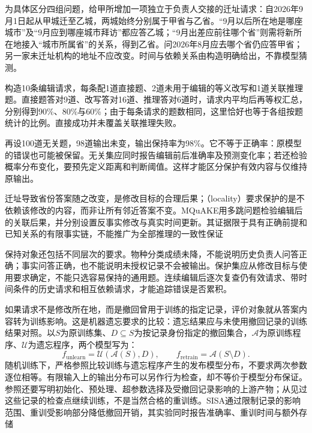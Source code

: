 为具体区分四组问题，给甲所增加一项独立于负责人交接的迁址请求：自2026年9月1日起从甲城迁至乙城，两城始终分别属于甲省与乙省。“9月以后所在地是哪座城市”及“9月应到哪座城市拜访”都应答乙城；“9月出差应前往哪个省”则需将新所在地接入“城市所属省”的关系，得到乙省。问2026年8月应去哪个省仍应答甲省；另一家未迁址机构的地址不应改变。时间与依赖关系由构造明确给出，不靠模型猜测。

构造10条编辑请求，每条配1道直接题、2道未用于编辑的等义改写和1道关联推理题。直接题答对9道、改写答对16道、推理答对6道时，请求内平均后再等权汇总，分别得到90\%、80\%与60\%；由于每条请求的题数相同，这里恰好也等于各组按题统计的比例。直接成功并未覆盖关联推理失败。

再设100道无关题，98道输出未变，输出保持率为98\%。它不等于正确率：原模型的错误也可能被保留。无关集应同时报告编辑前后准确率及预测变化率；若还检验概率分布变化，要预先定义距离和判断阈值。这样才能区分保护有效内容与仅维持原输出。

迁址导致省份答案随之改变，是修改目标的合理后果；（locality）要求保护的是不依赖该修改的内容，而非让所有邻近答案不变。MQuAKE用多跳问题检验编辑后的关联后果，并分别设置反事实修改与真实时间更新。其证据限于具有正确前提和已知关系的有限事实链，不能推广为全部推理的一致性保证

保持对象还包括不同层次的要求。物种分类成绩未降，不能说明历史负责人问答正确；事实问答正确，也不能说明未授权记录不会被输出。保护集应从修改目标与使用要求确定，不能只选容易保持的通用题。连续编辑后逐次复查仍有效请求、带时间条件的历史请求和相互依赖请求，才能追踪错误是否累积。

如果请求不是修改所在地，而是撤回曾用于训练的指定记录，评价对象就从答案内容转为训练影响。这是机器遗忘要求的比较：遗忘结果应与未使用撤回记录的训练结果对照。以$S$为原训练集、$D\subseteq S$为按记录身份指定的撤回集合，$\mathcal A$为原训练程序、$\mathcal U$为遗忘程序，两个模型写为：
\begin{equation}
  f_{\mathrm{unlearn}}=\mathcal U(\mathcal A(S),D),
  \qquad f_{\mathrm{retrain}}=\mathcal A(S\setminus D).
  \label{eq:ket-evaluation-unlearning-reference}
\end{equation}
随机训练下，严格参照比较训练与遗忘程序产生的发布模型分布，不要求两次参数逐位相等。有限输入上的输出分布可以另作行为检查，却不等价于模型分布保证。参照还要写明初始化、预处理、超参数选择及受撤回记录影响的上游产物；从见过这些记录的检查点继续训练，不是当然合格的重训练。SISA通过限制记录的影响范围、重训受影响部分降低撤回开销，其实验同时报告准确率、重训时间与额外存储

